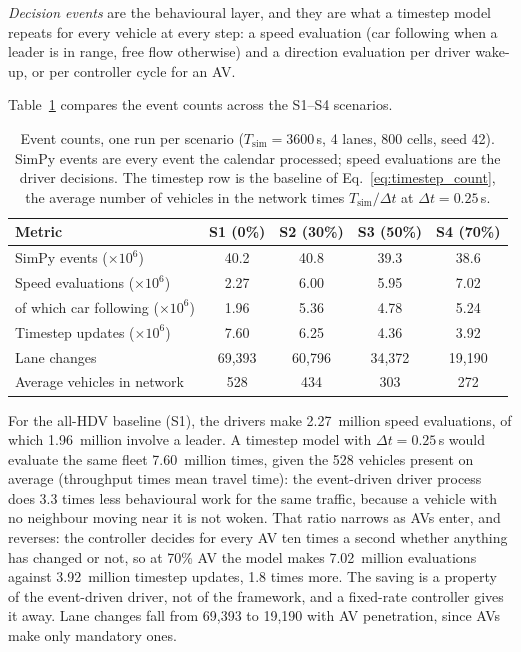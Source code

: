 \documentclass[review,authoryear]{elsarticle}
\begin{document}
\emph{Decision events} are the behavioural layer, and they are what a timestep model repeats for every vehicle at every step: a speed evaluation (car following when a leader is in range, free flow otherwise) and a direction evaluation per driver wake-up, or per controller cycle for an AV.

Table~\ref{tab:computational} compares the event counts across the S1--S4 scenarios.

\begin{table}[ht]
\centering
\caption{Event counts, one run per scenario ($T_{\text{sim}} = 3600$\,s, 4 lanes, 800 cells, seed 42). SimPy events are every event the calendar processed; speed evaluations are the driver decisions. The timestep row is the baseline of Eq.~\eqref{eq:timestep_count}, the average number of vehicles in the network times $T_{\text{sim}} / \Delta t$ at $\Delta t = 0.25$\,s.}
\label{tab:computational}
\begin{tabular}{@{}lcccc@{}}
\toprule
Metric & S1 (0\%) & S2 (30\%) & S3 (50\%) & S4 (70\%) \\
\midrule
SimPy events ($\times 10^6$) & 40.2 & 40.8 & 39.3 & 38.6 \\
Speed evaluations ($\times 10^6$) & 2.27 & 6.00 & 5.95 & 7.02 \\
of which car following ($\times 10^6$) & 1.96 & 5.36 & 4.78 & 5.24 \\
Timestep updates ($\times 10^6$) & 7.60 & 6.25 & 4.36 & 3.92 \\
Lane changes & 69{,}393 & 60{,}796 & 34{,}372 & 19{,}190 \\
Average vehicles in network & 528 & 434 & 303 & 272 \\
\bottomrule
\end{tabular}
\end{table}

For the all-HDV baseline (S1), the drivers make 2.27~million speed evaluations, of which 1.96~million involve a leader. A timestep model with $\Delta t = 0.25$\,s would evaluate the same fleet 7.60~million times, given the 528 vehicles present on average (throughput times mean travel time): the event-driven driver process does 3.3 times less behavioural work for the same traffic, because a vehicle with no neighbour moving near it is not woken. That ratio narrows as AVs enter, and reverses: the controller decides for every AV ten times a second whether anything has changed or not, so at 70\% AV the model makes 7.02~million evaluations against 3.92~million timestep updates, 1.8 times more. The saving is a property of the event-driven driver, not of the framework, and a fixed-rate controller gives it away. Lane changes fall from 69{,}393 to 19{,}190 with AV penetration, since AVs make only mandatory ones.
\end{document}
